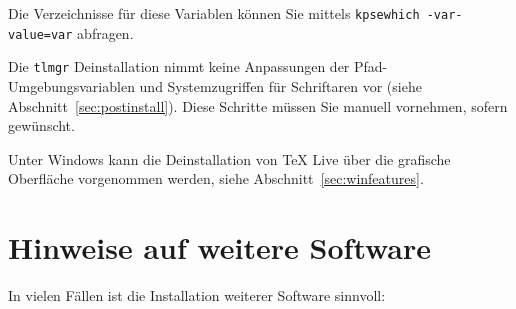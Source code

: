\documentclass[12pt,ngerman,a4paper,fullparskip]{scrreprt}
\newcommand{\code}[1]{\texttt{#1}}
\newcommand{\prog}[1]{\texttt{#1}}
\begin{document}
\noindent Die Verzeichnisse für diese Variablen können Sie mittels \code{kpsewhich -var-value=\code{var}} abfragen.

Die \prog{tlmgr} Deinstallation nimmt keine Anpassungen der Pfad-Umgebungsvariablen und Systemzugriffen für Schriftaren vor (siehe 
Abschnitt~\ref{sec:postinstall}). Diese Schritte müssen Sie manuell vornehmen, sofern gewünscht.

Unter Windows kann die Deinstallation von TeX Live über die grafische Oberfläche vorgenommen werden, siehe Abschnitt~\ref{sec:winfeatures}.

\section{Hinweise auf weitere Software}

In vielen Fällen ist die Installation weiterer Software sinnvoll:
\end{document}

